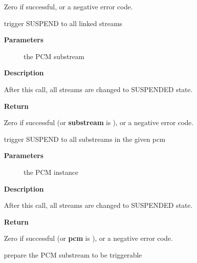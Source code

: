\documentclass[a4paper,8pt,english]{sphinxmanual}
\begin{document}
Zero if successful, or a negative error code.

\begin{fulllineitems}
\label{sound/kernel-api/alsa-driver-api:c.snd_pcm_suspend}
trigger SUSPEND to all linked streams

\end{fulllineitems}


\textbf{Parameters}
\begin{description}
\item[{}] \leavevmode
the PCM substream

\end{description}

\textbf{Description}

After this call, all streams are changed to SUSPENDED state.

\textbf{Return}

Zero if successful (or \textbf{substream} is ), or a negative error
code.

\begin{fulllineitems}
\label{sound/kernel-api/alsa-driver-api:c.snd_pcm_suspend_all}
trigger SUSPEND to all substreams in the given pcm

\end{fulllineitems}


\textbf{Parameters}
\begin{description}
\item[{}] \leavevmode
the PCM instance

\end{description}

\textbf{Description}

After this call, all streams are changed to SUSPENDED state.

\textbf{Return}

Zero if successful (or \textbf{pcm} is ), or a negative error code.

\begin{fulllineitems}
\label{sound/kernel-api/alsa-driver-api:c.snd_pcm_prepare}
prepare the PCM substream to be triggerable

\end{fulllineitems}
\end{document}

